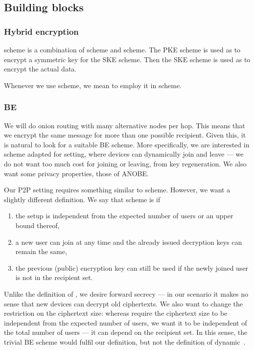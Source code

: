 \subsection{Building blocks}%
\label{BuildingBlocks}

\subsubsection{Hybrid encryption}\label{KEM}

 scheme is a combination of  scheme and  scheme.
The \ac{PKE} scheme is used as  to encrypt a symmetric key for the 
\ac{SKE} scheme.
Then the \ac{SKE} scheme is used as  to encrypt the actual data.

Whenever we use  scheme, we mean to employ it in  scheme.

\subsubsection{\Acl*{BE}}\label{BE}

We will do onion routing with many alternative nodes per hop.
This means that we encrypt the same message for more than one possible 
recipient.
Given this, it is natural to look for a suitable \ac{BE} scheme.
More specifically, we are interested in  scheme adapted for  
setting, where devices can dynamically join and leave --- \ie we do not want too 
much cost for joining or leaving, \eg from key regeneration.
We also want some privacy properties, \eg those of \ac{ANOBE}.

Our \ac{P2P} setting requires something similar to  scheme.
However, we want a slightly different definition.
We say that  scheme is  if
\begin{enumerate}
  \item the setup is independent from the expected number of users or an upper 
    bound thereof,
  \item a new user can join at any time and the already issued decryption keys 
    can remain the same,
  \item the previous (public) encryption key can still be used if the newly 
    joined user is not in the recipient set.
\end{enumerate}
Unlike the definition of \textcite{DynamicBroadcastEncryption}, we desire 
forward secrecy --- in our scenario it makes no sense that new devices can 
decrypt old ciphertexts.
We also want to change the restriction on the ciphertext size:
whereas \textcite{DynamicBroadcastEncryption} require the ciphertext size to be 
independent from the expected number of users, we want it to be independent of 
the total number of users --- \ie it can depend on the recipient set.
In this sense, the trivial \ac{BE} scheme would fulfil our definition, but not 
the definition of dynamic~\cite{DynamicBroadcastEncryption}.

